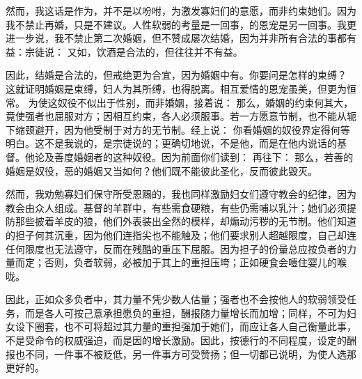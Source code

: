 然而，我这话是作为，并不是以吩咐，为激发寡妇们的意愿，而非约束她们。因为我不禁止再婚，只是不建议。人性软弱的考量是一回事，的恩宠是另一回事。我更进一步说，我不禁止第二次婚姻，但不赞成屡次结婚，因为并非所有合法的事都有益：宗徒说：   又如，饮酒是合法的，但往往并不有益。\par

因此，结婚是合法的，但戒绝更为合宜，因为婚姻中有。你要问是怎样的束缚？  这就证明婚姻是束缚，妇人为其所缚，也得脱离。相互爱情的恩宠虽美，但更为恒常。  为使这奴役不似出于性别，而非婚姻，接着说： 那么，婚姻的约束何其大，竟使强者也屈服对方；因相互约束，各人必须服事。若一方愿意节制，也不能从轭下缩颈避开，因为他受制于对方的无节制。经上说：  你看婚姻的奴役界定得何等明白。这不是我说的，是宗徒说的；更确切地说，不是他，而是在他内说话的基督。他论及善度婚姻者的这种奴役。因为前面你们读到：  再往下：  那么，若善的婚姻是奴役，恶的婚姻又当如何？他们既不能彼此圣化，反而彼此毁灭。\par

然而，我劝勉寡妇们保守所受恩赐的，我也同样激励妇女们遵守教会的纪律，因为教会由众人组成。基督的羊群中，有些需食硬粮，有些仍需哺以乳汁；她们必须提防那些披着羊皮的狼，他们外表装出全然的模样，却煽动污秽的无节制。他们知道的担子何其沉重，因为他们连指尖也不能触及；他们要求别人超越限度，自己却连任何限度也无法遵守，反而在残酷的重压下屈服。因为担子的份量总应按负者的力量而定；否则，负者软弱，必被加于其上的重担压垮；正如硬食会噎住婴儿的喉咙。\par

因此，正如众多负者中，其力量不凭少数人估量；强者也不会按他人的软弱领受任务，而是各人可按己意承担愿负的重担，酬报随力量增长而加增；同样，不可为妇女设下圈套，也不可将超过其力量的重担强加于她们，而应让各人自己衡量此事，不是受命令的权威强迫，而是因的增长激励。因此，按德行的不同程度，设定的酬报也不同，一件事不被贬低，另一件事方可受赞扬；但一切都已说明，为使人选那更好的。\par

